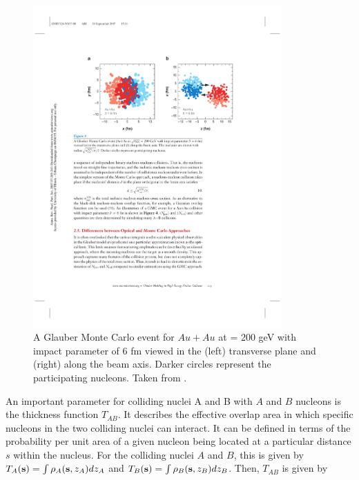 \begin{figure}[htbp]
\begin{center}
\includegraphics[width=0.85\textwidth]{figures/theory/glauberMC}
\caption{A Glauber Monte Carlo event for $Au+Au$ at \sqrtsnn = 200 geV with impact parameter of 6 fm viewed in the (left) transverse plane and (right) along the beam axis. Darker circles represent the participating nucleons. Taken from \cite{doi:10.1146/annurev.nucl.57.090506.123020}. }
\label{fig:glauberMC}
\end{center}
\end{figure}



An important parameter for colliding nuclei A and B with $A$ and $B$ nucleons is the thickness function $T_{AB}$. It describes the effective overlap area in which specific nucleons in the two colliding nuclei can interact. It can be defined in terms of the probability per unit area of a given nucleon being located at a particular distance $s$ within the nucleus. For the colliding nuclei $A$ and $B$, this is given by $T_{A}({\bf{s}}) = \int \rho_A ({\bf{s}}, z_A) dz_{A}$ and $T_{B}({\bf{s}}) = \int \rho_B ({\bf{s}}, z_B) dz_{B}$. Then, $T_{AB}$ is given by

